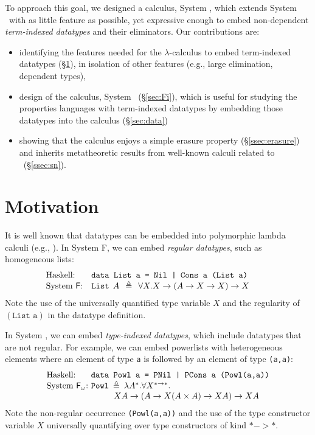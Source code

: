 To approach this goal, we designed a calculus, System \Fi,
which extends System \Fw\ with as little feature as possible,
yet expressive enough to embed non-dependent \emph{term-indexed datatypes}
and their eliminators. Our contributions are:\vspace*{-3pt}
\begin{itemize}
\item identifying the features needed for the $\lambda$-calculus
    to embed term-indexed datatypes (\S\ref{sec:motiv}),
    in isolation of other features (e.g., large elimination, dependent types),
    \vspace*{-2pt}
\item design of the calculus, System \Fi\ (\S\ref{sec:Fi}), which is
    useful for studying the properties languages with term-indexed datatypes
    by embedding those datatypes into the calculus (\S\ref{sec:data})
    \vspace*{-2pt}
\item showing that the calculus enjoys a simple erasure property
    (\S\ref{ssec:erasure}) and inherits metatheoretic results
    from well-known calculi related to \Fi\ (\S\ref{ssec:sn}).
\end{itemize}\vspace*{-3pt}


\section{Motivation}
\label{sec:motiv}
It is well known that datatypes can be embedded into polymorphic lambda calculi
(e.g., \cite{AbeMatUus03}).  In System \textsf{F}, we can embed \emph{regular datatypes},
such as homogeneous lists:
\[\!\!\!\!\!\!\!\!\!
\begin{array}{ll}
\text{Haskell:} & \texttt{data List a = Nil | Cons a (List a)} \\
\text{System \textsf{F}:} & \texttt{{List}}\:\: A\:\:\triangleq\:\:\forall X.X\to(A\to X\to X)\to X ~~\;
\end{array}
\]
Note the use of the universally quantified type variable $X$
and the regularity of $(\texttt{List a})$ in the datatype definition.

In System \Fw, we can embed \emph{type-indexed datatypes}, which include
datatypes that are not regular. For example, we can embed powerlists with
heterogeneous elements where an element of type \texttt{a} is followed by
an element of type \texttt{(a,a)}:
\[
\begin{array}{ll}
\text{Haskell:} & \!\!\!\!\texttt{data Powl a = PNil | PCons a (Powl(a,a))} \\
\text{System \Fw:} & \!\!\!\!\texttt{{Powl}}\:\triangleq\:
\lambda A^{*}.\forall X^{*\to*}.\\ \qquad
& \qquad X A\to (A\to X(A\times A)\to X A)\to XA
\end{array}
\]
Note the non-regular occurrence \texttt{(Powl(a,a))} and
the use of the type constructor variable $X$ universally quantifying over
type constructors of kind $* -> *$.

